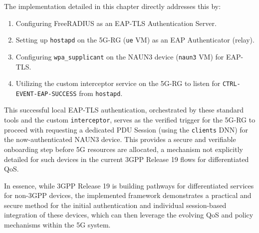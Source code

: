 The implementation detailed in this chapter directly addresses this by:

\begin{enumerate}
    \item Configuring FreeRADIUS as an \ac{EAP-TLS} Authentication Server.
    
    \item Setting up \texttt{hostapd} on the \ac{5G-RG} (\texttt{ue} \ac{VM}) as an \ac{EAP} Authenticator (relay).
    
    \item Configuring \texttt{wpa\_supplicant} on the \ac{NAUN3} device (\texttt{naun3} \ac{VM}) for \ac{EAP-TLS}.
    
    \item Utilizing the custom interceptor service on the \ac{5G-RG} to listen for \texttt{CTRL-EVENT-EAP-SUCCESS} from \texttt{hostapd}.
\end{enumerate}

This successful local \ac{EAP-TLS} authentication, orchestrated by these standard tools and the custom \texttt{interceptor}, serves as the verified trigger for the \ac{5G-RG} to proceed with requesting a dedicated \ac{PDU} Session (using the \texttt{clients} \ac{DNN}) for the now-authenticated \ac{NAUN3} device. This provides a secure and verifiable onboarding step before \ac{5G} resources are allocated, a mechanism not explicitly detailed for such devices in the current \ac{3GPP} Release 19 flows for differentiated \ac{QoS}.

In essence, while 3GPP Release 19 is building pathways for differentiated services for non-\ac{3GPP} devices, the implemented framework demonstrates a practical and secure method for the initial authentication and individual session-based integration of these devices, which can then leverage the evolving \ac{QoS} and policy mechanisms within the \ac{5G} system.